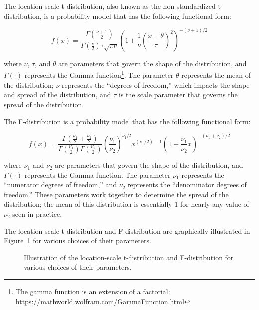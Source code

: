 \documentclass[
  letterpaper,
  DIV=11,
  numbers=noendperiod]{scrreprt}
\theoremstyle{plain}
\theoremstyle{definition}
\theoremstyle{definition}
\theoremstyle{remark}
\begin{document}
The location-scale t-distribution, also known as the non-standardized
t-distribution, is a probability model that has the following functional
form:

\[f(x) = \frac{\Gamma\left(\frac{\nu + 1}{2}\right)}{\Gamma\left(\frac{\nu}{2}\right) \tau \sqrt{\pi \nu}} \left(1 + \frac{1}{\nu}\left(\frac{x - \theta}{\tau}\right)^2\right)^{-(\nu + 1)/2}\]

where \(\nu\), \(\tau\), and \(\theta\) are parameters that govern the
shape of the distribution, and \(\Gamma(\cdot)\) represents the Gamma
function\footnote{The gamma function is an extension of a factorial:
  https://mathworld.wolfram.com/GammaFunction.html}. The parameter
\(\theta\) represents the mean of the distribution; \(\nu\) represents
the ``degrees of freedom,'' which impacts the shape and spread of the
distribution, and \(\tau\) is the scale parameter that governs the
spread of the distribution.

The F-distribution is a probability model that has the following
functional form:

\[f(x) = \frac{\Gamma\left(\frac{\nu_1}{2} + \frac{\nu_2}{2}\right)}{\Gamma\left(\frac{\nu_1}{2}\right)\Gamma\left(\frac{\nu_2}{2}\right)} \left(\frac{\nu_1}{\nu_2}\right)^{\nu_1/2} x^{\left(\nu_1/2\right)-1} \left(1 + \frac{\nu_1}{\nu_2}x\right)^{-\left(\nu_1 + \nu_2\right)/2}\]

where \(\nu_1\) and \(\nu_2\) are parameters that govern the shape of
the distribution, and \(\Gamma(\cdot)\) represents the Gamma function.
The parameter \(\nu_1\) represents the ``numerator degrees of freedom,''
and \(\nu_2\) represents the ``denominator degrees of freedom.'' These
parameters work together to determine the spread of the distribution;
the mean of this distribution is essentially 1 for nearly any value of
\(\nu_2\) seen in practice.

The location-scale t-distribution and F-distribution are graphically
illustrated in Figure~\ref{fig-app-theory-tf} for various choices of
their parameters.

\begin{figure}


\caption{\label{fig-app-theory-tf}Illustration of the location-scale
t-distribution and F-distribution for various choices of their
parameters.}

\end{figure}%
\end{document}
